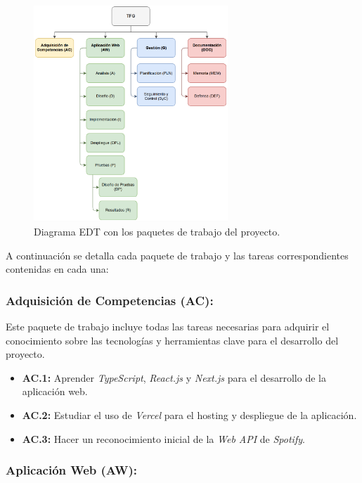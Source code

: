 \begin{figure}[H]
    \centering
    \includegraphics[width=0.65\textwidth]{figures/edt.png}
    \caption{Diagrama EDT con los paquetes de trabajo del proyecto.}
    \label{fig:edt}
\end{figure}

A continuación se detalla cada paquete de trabajo y las tareas correspondientes contenidas en cada una:

\subsubsection{Adquisición de Competencias (AC):}

Este paquete de trabajo incluye todas las tareas necesarias para adquirir el conocimiento sobre las tecnologías y herramientas clave para el desarrollo del proyecto.

\begin{itemize}[itemsep=0.2em]
    \item \textbf{AC.1:} Aprender \textit{TypeScript}, \textit{React.js} y \textit{Next.js} para el desarrollo de la aplicación web.
    \item \textbf{AC.2:} Estudiar el uso de \textit{Vercel} para el hosting y despliegue de la aplicación.
    \item \textbf{AC.3:} Hacer un reconocimiento inicial de la \textit{Web API} de \textit{Spotify}.
\end{itemize}

\subsubsection{Aplicación Web (AW):}

